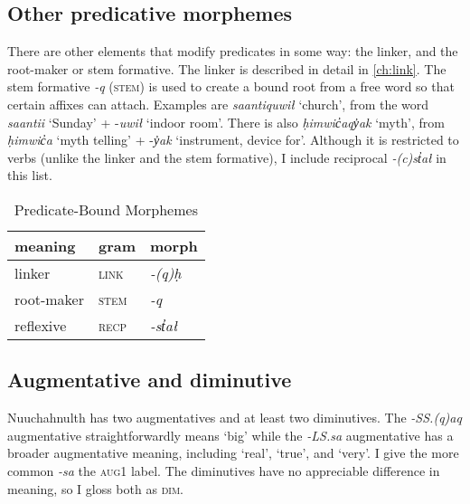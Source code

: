 \subsection{Other predicative morphemes}

There are other elements that modify predicates in some way: the linker, and the root-maker or stem formative. The linker is described in detail in \cref{ch:link}. The stem formative \textit{-q} (\textsc{stem}) is used to create a bound root from a free word so that certain affixes can attach. Examples are \textit{saantiquwił} `church', from the word \textit{saantii} `Sunday' + -\textit{uwił} `indoor room'. There is also \textit{ḥimwic̓aqy̓ak} `myth', from \textit{ḥimwic̓a} `myth telling' + -\textit{y̓ak} `instrument, device for'. Although it is restricted to verbs (unlike the linker and the stem formative), I include reciprocal \textit{-(c)st̓ał} in this list.

\begin{table}[ht]
\centering
\caption{Predicate-Bound Morphemes}
\label{table:predicate}
\begin{tabular}{lll}
meaning                         & gram              & morph                       \\ \hline
\multicolumn{1}{|l|}{linker}    & \multicolumn{1}{l|}{\textsc{link}} & \multicolumn{1}{l|}{\textit{-(q)ḥ}} \\ \hline
\multicolumn{1}{|l|}{root-maker}    & \multicolumn{1}{l|}{\textsc{stem}} & \multicolumn{1}{l|}{\textit{-q}} \\ \hline
\multicolumn{1}{|l|}{reflexive} & \multicolumn{1}{l|}{\textsc{recp}} & \multicolumn{1}{l|}{\textit{-st̓ał}} \\ \hline
\end{tabular}
\end{table}

\subsection{Augmentative and diminutive}

Nuuchahnulth has two augmentatives and at least two diminutives. The \textit{-SS.(q)aq} augmentative straightforwardly means `big' while the \textit{-LS.sa} augmentative has a broader augmentative meaning, including `real', `true', and `very'. I give the more common \textit{-sa} the \textsc{aug1} label. The diminutives have no appreciable difference in meaning, so I gloss both as \textsc{dim}.

